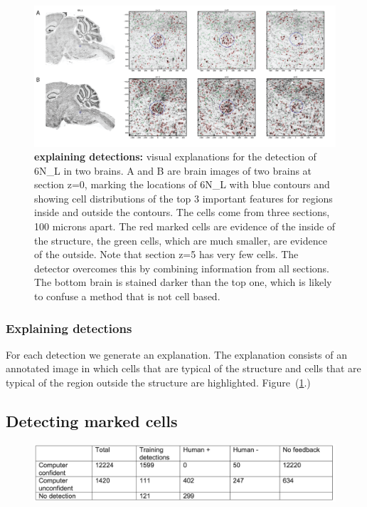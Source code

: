 \documentclass[runningheads]{llncs}
\begin{document}
\begin{figure}[b]
  \includegraphics[width=\textwidth]{figures/DetectionExplanation.png}
  \caption{\label{fig:explaining} {\bf explaining detections:} visual explanations for the
    detection of 6N\_L in two brains. A and B are brain images of two
    brains at section z=0, marking the locations of 6N\_L with blue
    contours and showing cell distributions of the top 3 important
    features for regions inside and outside the contours.  The cells
    come from three sections, 100 microns apart. The red marked cells
    are evidence of the inside of the structure, the green cells,
    which are much smaller, are evidence of the outside. Note that
    section z=5 has very few cells. The detector overcomes this by
    combining information from all sections.  The bottom brain is
    stained darker than the top one, which is likely to confuse a
    method that is not cell based.}
  \end{figure}

\subsubsection{Explaining detections}
For each detection we generate an explanation. The explanation
consists of an annotated image in which cells that are typical of the
structure and cells that are typical of the region outside the
structure are highlighted. Figure~(\ref{fig:explaining}.)


\subsection{Detecting marked cells}

\begin{figure}[t]
  \includegraphics[width=\textwidth]{figures/MarkedCellsDetectionNumbers.png}
\end{figure}
\end{document}
